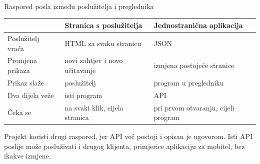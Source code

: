 \begin{frame}{Raspored posla između poslužitelja i preglednika}
\vspace{0.3em}
\begin{center}
{\small
\setlength{\tabcolsep}{6pt}
\renewcommand{\arraystretch}{1.35}
\begin{tabular}{@{}L{2.9cm}L{4.5cm}L{4.5cm}@{}}
  \toprule
   & \textbf{Stranica s poslužitelja} & \textbf{Jednostranična aplikacija} \\
  \midrule
  Poslužitelj vraća & HTML za svaku stranicu & JSON \\
  Promjena prikaza & novi zahtjev i novo učitavanje & izmjena postojeće stranice \\
  Prikaz slaže & poslužitelj & program u pregledniku \\
  Dva dijela veže & isti program & API \\
  Čeka se & na svaki klik, cijela stranica & pri prvom otvaranju, cijeli program \\
  \bottomrule
\end{tabular}
}
\end{center}

\vspace{0.6em}
Projekt koristi drugi raspored, jer API već postoji i opisan je ugovorom. Isti API poslije može posluživati i drugog klijenta, primjerice aplikaciju za mobitel, bez ikakve izmjene.
\end{frame}

